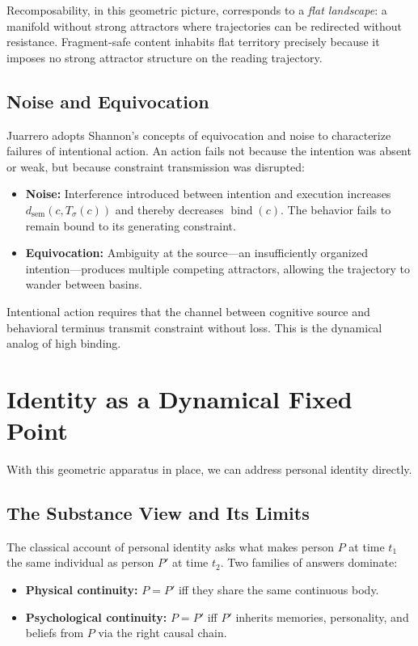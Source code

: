 \documentclass[11pt]{article}
\newcommand{\bind}{\operatorname{bind}}
\newcommand{\dsem}{d_{\mathrm{sem}}}
\begin{document}
Recomposability, in this geometric picture, corresponds to a \emph{flat landscape}: a
manifold without strong attractors where trajectories can be redirected without
resistance. Fragment-safe content inhabits flat territory precisely because it imposes no
strong attractor structure on the reading trajectory.

\subsection{Noise and Equivocation}

Juarrero adopts Shannon's concepts of equivocation and noise to characterize failures of
intentional action. An action fails not because the intention was absent or weak, but
because constraint transmission was disrupted:

\begin{itemize}
  \item \textbf{Noise:} Interference introduced between intention and execution increases
        $\dsem(c, T_\sigma(c))$ and thereby decreases $\bind(c)$. The behavior fails to
        remain bound to its generating constraint.
  \item \textbf{Equivocation:} Ambiguity at the source---an insufficiently organized
        intention---produces multiple competing attractors, allowing the trajectory to
        wander between basins.
\end{itemize}

Intentional action requires that the channel between cognitive source and behavioral
terminus transmit constraint without loss. This is the dynamical analog of high binding.

\section{Identity as a Dynamical Fixed Point}

With this geometric apparatus in place, we can address personal identity directly.

\subsection{The Substance View and Its Limits}

The classical account of personal identity asks what makes person $P$ at time $t_1$ the
same individual as person $P'$ at time $t_2$. Two families of answers dominate:

\begin{itemize}
  \item \textbf{Physical continuity:} $P = P'$ iff they share the same continuous body.
  \item \textbf{Psychological continuity:} $P = P'$ iff $P'$ inherits memories,
        personality, and beliefs from $P$ via the right causal chain.
\end{itemize}
\end{document}
